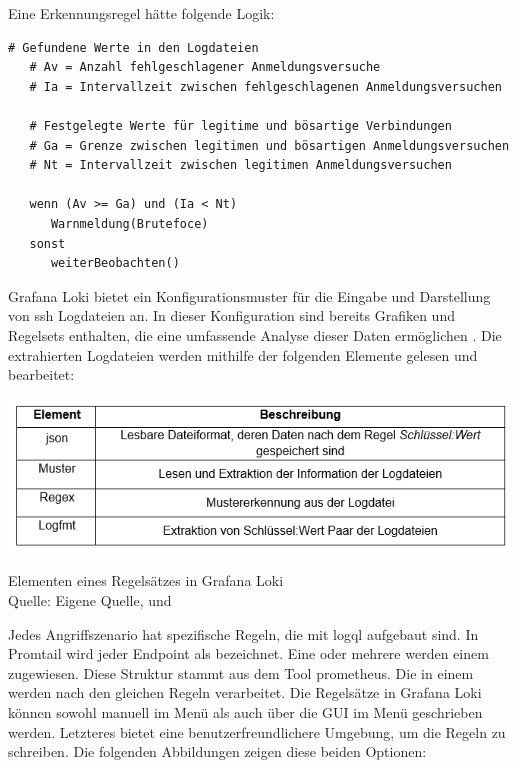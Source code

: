 Eine Erkennungsregel hätte folgende Logik:
{
\begin{Verbatim}[frame=single]
   # Gefundene Werte in den Logdateien
   # Av = Anzahl fehlgeschlagener Anmeldungsversuche
   # Ia = Intervallzeit zwischen fehlgeschlagenen Anmeldungsversuchen

   # Festgelegte Werte für legitime und bösartige Verbindungen
   # Ga = Grenze zwischen legitimen und bösartigen Anmeldungsversuchen
   # Nt = Intervallzeit zwischen legitimen Anmeldungsversuchen

   wenn (Av >= Ga) und (Ia < Nt)
      Warnmeldung(Brutefoce)
   sonst
      weiterBeobachten()
\end{Verbatim}
}

\newpage
Grafana Loki bietet ein Konfigurationsmuster für die Eingabe und Darstellung von \gls{ssh} Logdateien an. In dieser Konfiguration sind bereits Grafiken und Regelsets enthalten, die eine umfassende Analyse dieser Daten ermöglichen \citep{VoidQuark_sshlogs}. Die extrahierten Logdateien werden mithilfe der folgenden Elemente gelesen und bearbeitet:

\begin{table}[H]
   \includegraphics[width=\linewidth]{assets/tabelle_sshgrafana.png}
   \caption{Elementen eines Regelsätzes in Grafana Loki \\Quelle: Eigene Quelle, \citep{VoidQuark_sshlogs} und \citep{Setter_Logfmt}}
\end{table}

Jedes Angriffszenario hat spezifische Regeln, die mit \gls{logql} aufgebaut sind. In Promtail wird jeder \gls{Endpoint} als  bezeichnet. Eine oder mehrere  werden einem  zugewiesen. Diese Struktur stammt aus dem Tool \gls{prometheus}. Die  in einem  werden nach den gleichen Regeln verarbeitet. Die Regelsätze in Grafana Loki können sowohl manuell im Menü  als auch über die \gls{GUI} im Menü  geschrieben werden. Letzteres bietet eine benutzerfreundlichere Umgebung, um die Regeln zu schreiben. Die folgenden Abbildungen zeigen diese beiden Optionen:

